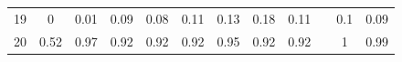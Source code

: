 \documentclass[twoside,11pt]{article}
\begin{document}
\begin{table}[H]
{\begin{tabular}{ccccccccclcc}
\multicolumn{1}{|c|}{19}                                                                          & \multicolumn{1}{c|}{0}                                                              & \multicolumn{1}{c|}{0.01}                                                                      & \multicolumn{1}{c|}{0.09}                                                                & \multicolumn{1}{c|}{0.08}                                                                & \multicolumn{1}{c|}{0.11}                                                                & \multicolumn{1}{c|}{\cellcolor[HTML]{ECF4FF}0.13}                                           & \multicolumn{1}{c|}{\cellcolor[HTML]{FFCCC9}0.18}                                           & \multicolumn{1}{c|}{0.11}                                                                   & \multicolumn{1}{l|}{}                    & \multicolumn{1}{c|}{0.1}                                                                       & \multicolumn{1}{c|}{0.09}                                                                      \\ \cline{1-1}
\multicolumn{1}{|c|}{20}                                                                          & \multicolumn{1}{c|}{0.52}                                                           & \multicolumn{1}{c|}{\cellcolor[HTML]{FFCCC9}0.97}                                              & \multicolumn{1}{c|}{0.92}                                                                & \multicolumn{1}{c|}{0.92}                                                                & \multicolumn{1}{c|}{0.92}                                                                & \multicolumn{1}{c|}{\cellcolor[HTML]{ECF4FF}0.95}                                           & \multicolumn{1}{c|}{0.92}                                                                   & \multicolumn{1}{c|}{0.92}                                                                   & \multicolumn{1}{l|}{}                    & \multicolumn{1}{c|}{1}                                                                         & \multicolumn{1}{c|}{0.99}                                                                      \\ \cline{1-9} \cline{11-12} 

\end{tabular}}
\end{table}
\end{document}

